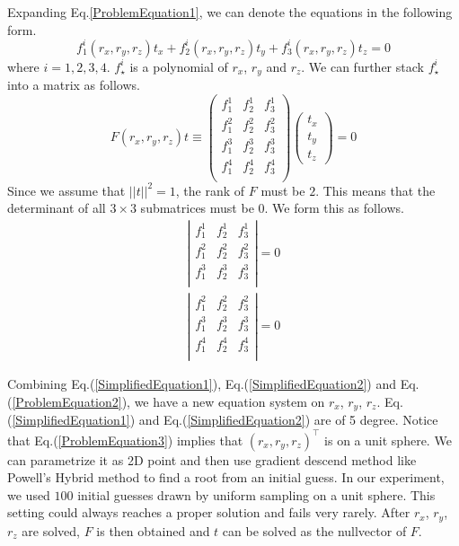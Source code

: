 \documentclass[letterpaper, 10 pt, conference]{ieeeconf}
\begin{document}
Expanding Eq.\ref{ProblemEquation1}, we can denote the equations in the following form. 
\begin{equation}
f_1^i(r_x, r_y, r_z) t_x + f_2^i(r_x, r_y, r_z) t_y + f_3^i(r_x, r_y, r_z) t_z = 0
\end{equation}
where $i = 1, 2, 3, 4$. $f_\star^i$ is a polynomial of $r_x$, $r_y$ and $r_z$. We can further stack $f_\star^i$ into a matrix as follows. 
\begin{equation}
F(r_x, r_y, r_z) t \equiv \left( 
	\begin{array}{clr}
	f_1^1 & f_2^1 & f_3^1 \\
	f_1^2 & f_2^2 & f_3^2 \\
	f_1^3 & f_2^3 & f_3^3 \\
	f_1^4 & f_2^4 & f_3^4 \\	
	\end{array}
\right) \left(
	\begin{array}{clr}
	t_x \\ t_y \\t_z
	\end{array}
\right) = 0	
\end{equation}
Since we assume that $||t||^2 = 1$, the rank of $F$ must be $2$. This means that the determinant of all $3 \times 3$ submatrices must be 0. We form this as follows. 
\begin{eqnarray}
\label{SimplifiedEquation1}
\left| 
	\begin{array}{clr}
	f_1^1 & f_2^1 & f_3^1 \\
	f_1^2 & f_2^2 & f_3^2 \\
	f_1^3 & f_2^3 & f_3^3 \\
	\end{array}
\right| = 0 \\ 
\label{SimplifiedEquation2}
\left| 
	\begin{array}{clr}
	f_1^2 & f_2^2 & f_3^2 \\
	f_1^3 & f_2^3 & f_3^3 \\
	f_1^4 & f_2^4 & f_3^4 \\	
	\end{array}
\right| = 0 
\end{eqnarray}

Combining Eq.(\ref{SimplifiedEquation1}), Eq.(\ref{SimplifiedEquation2}) and Eq.(\ref{ProblemEquation2}), we have a new equation system on $r_x$, $r_y$, $r_z$. Eq.(\ref{SimplifiedEquation1}) and Eq.(\ref{SimplifiedEquation2}) are of 5 degree. Notice that Eq.(\ref{ProblemEquation3}) implies that $(r_x, r_y, r_z)^\top$ is on a unit sphere. We can parametrize it as 2D point and then use gradient descend method like Powell's Hybrid method to find a root from an initial guess. In our experiment, we used $100$ initial guesses drawn by uniform sampling on a unit sphere. This setting could always reaches a proper solution and fails very rarely. After $r_x$, $r_y$, $r_z$ are solved, $F$ is then obtained and $t$ can be solved as the nullvector of $F$. 
\end{document}
